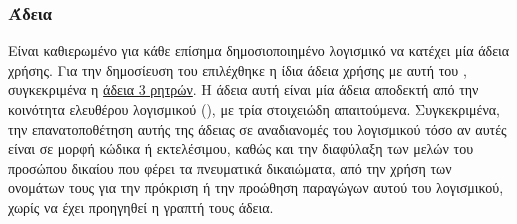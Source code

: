 \subsubsection{Άδεια}
Είναι καθιερωμένο για κάθε επίσημα δημοσιοποιημένο λογισμικό να κατέχει μία άδεια χρήσης.
Για την δημοσίευση του  επιλέχθηκε η ίδια άδεια χρήσης με αυτή του \href{https://en.wikipedia.org/wiki/Scikit-learn}{}, συγκεκριμένα η \href{https://en.wikipedia.org/wiki/BSD_licenses#3-clause_license_(%22BSD_License_2.0%22,_%22Revised_BSD_License%22,_%22New_BSD_License%22,_or_%22Modified_BSD_License%22)}{άδεια \en{BSD} 3 ρητρών}.
Η άδεια αυτή είναι μία άδεια αποδεκτή από την κοινότητα ελευθέρου λογισμικού (), με τρία στοιχειώδη απαιτούμενα.
Συγκεκριμένα, την επανατοποθέτηση αυτής της άδειας σε αναδιανομές του λογισμικού τόσο αν αυτές είναι σε μορφή κώδικα ή εκτελέσιμου, καθώς και την διαφύλαξη των μελών του προσώπου δικαίου που φέρει τα πνευματικά δικαιώματα, από την χρήση των ονομάτων τους για την πρόκριση ή την προώθηση παραγώγων αυτού του λογισμικού, χωρίς να έχει προηγηθεί η γραπτή τους άδεια.
